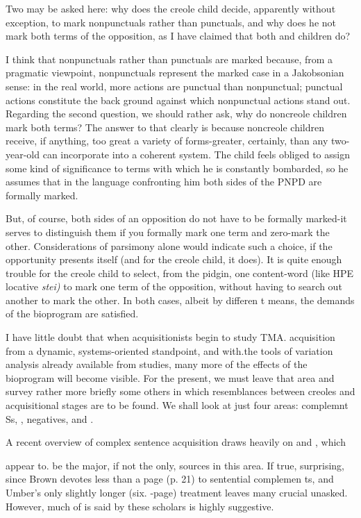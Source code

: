 Two  may be asked here: why does the creole child decide, apparently without exception, to mark nonpunctuals rather than punctuals, and why does he not mark both terms of the opposi\-tion, as I have claimed that both  and  children do?

I think that nonpunctuals rather than punctuals are marked because, from a pragmatic viewpoint, nonpunctuals represent the marked case in a Jakobsonian sense: in the real world, more actions are punctual than nonpunctual; punctual actions constitute the back%
ground against which nonpunctual actions stand out. Regarding the second question, we should rather ask, why do noncreole children mark both terms? The answer to that clearly is because noncreole children receive, if anything, too great a variety of forms-greater, certainly, than any two-year-old can incorporate into a coherent system. The child feels obliged to assign some kind of significance to terms with which he is constantly bombarded, so he assumes that in the language confronting him both sides of the PNPD are formally marked.

But, of course, both sides of an opposition do not have to be formally marked-it serves to distinguish them if you formally mark one term and zero-mark the other. Considerations of parsimony alone would indicate such a choice, if the opportunity presents itself (and for the creole child, it does). It is quite enough trouble for the creole child
to select, from the pidgin, one content-word (like HPE locative \textit{stei)}
to mark one term of the opposition, without having to search out another to mark the other. In both cases, albeit by differen t means, the demands of the bioprogram are satisfied.

I have little doubt that when acquisitionists begin to study TMA. acquisition from a dynamic, systems-oriented standpoint, and with.the tools of variation analysis already available from  studies, many more of the effects of the bioprogram will become visible. For the present, we must leave that area and survey rather more briefly some others in which resemblances between creoles and acqui\-sitional stages are to be found. We shall look at just four areas: comple\-mnt Ss, , negatives, and .

A recent overview of complex sentence acquisition \citep{Bowerman1979} draws heavily on \citet{Brown1973} and \citet{Limber1973}, which

appear to. be the major, if not the only, sources in this area. If true,
surprising, since Brown devotes less than a page (p. 21) to sen\-tential complemen ts, and Umber's only slightly longer (six. {}-page) treatment leaves many crucial  unasked. However, much of
is said by these scholars is highly suggestive.

